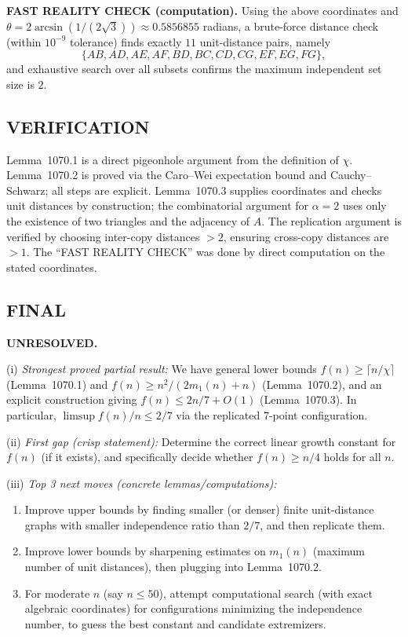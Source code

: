 \textbf{FAST REALITY CHECK (computation).}
Using the above coordinates and $\theta=2\arcsin(1/(2\sqrt{3}))\approx 0.5856855$ radians, a brute-force distance check (within $10^{-9}$ tolerance) finds exactly $11$ unit-distance pairs, namely
\[
\{AB,AD,AE,AF,BD,BC,CD,CG,EF,EG,FG\},
\]
and exhaustive search over all subsets confirms the maximum independent set size is $2$.

\subsection*{VERIFICATION}
Lemma~1070.1 is a direct pigeonhole argument from the definition of $\chi$.
Lemma~1070.2 is proved via the Caro--Wei expectation bound and Cauchy--Schwarz; all steps are explicit.
Lemma~1070.3 supplies coordinates and checks unit distances by construction; the combinatorial argument for $\alpha=2$ uses only the existence of two triangles and the adjacency of $A$.
The replication argument is verified by choosing inter-copy distances $>2$, ensuring cross-copy distances are $>1$.
The ``FAST REALITY CHECK'' was done by direct computation on the stated coordinates.

\subsection*{FINAL}
\textbf{UNRESOLVED.}

(i) \emph{Strongest proved partial result:}
We have general lower bounds $f(n)\ge \lceil n/\chi\rceil$ (Lemma~1070.1) and $f(n)\ge n^2/(2m_1(n)+n)$ (Lemma~1070.2), and an explicit construction giving $f(n)\le 2n/7+O(1)$ (Lemma~1070.3).  In particular, $\limsup f(n)/n\le 2/7$ via the replicated 7-point configuration.

(ii) \emph{First gap (crisp statement):}
Determine the correct linear growth constant for $f(n)$ (if it exists), and specifically decide whether $f(n)\ge n/4$ holds for all $n$.

(iii) \emph{Top 3 next moves (concrete lemmas/computations):}
\begin{enumerate}
\item Improve upper bounds by finding smaller (or denser) finite unit-distance graphs with smaller independence ratio than $2/7$, and then replicate them.
\item Improve lower bounds by sharpening estimates on $m_1(n)$ (maximum number of unit distances), then plugging into Lemma~1070.2.
\item For moderate $n$ (say $n\le 50$), attempt computational search (with exact algebraic coordinates) for configurations minimizing the independence number, to guess the best constant and candidate extremizers.
\end{enumerate}

